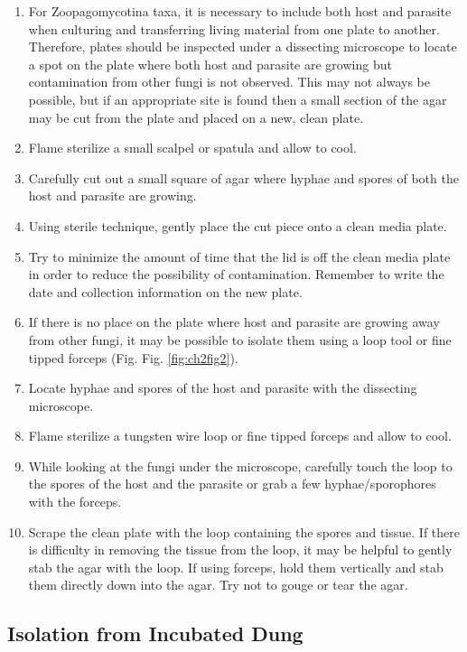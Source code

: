 \documentclass[]{book}
\providecommand{\tightlist}{%
  \setlength{\itemsep}{0pt}\setlength{\parskip}{0pt}}
\begin{document}
\begin{enumerate}
\def\labelenumi{\arabic{enumi}.}
\tightlist
\item
  For Zoopagomycotina taxa, it is necessary to include both host and parasite when culturing and transferring living material from one plate to another. Therefore, plates should be inspected under a dissecting microscope to locate a spot on the plate where both host and parasite are growing but contamination from other fungi is not observed. This may not always be possible, but if an appropriate site is found then a small section of the agar may be cut from the plate and placed on a new, clean plate.
\item
  Flame sterilize a small scalpel or spatula and allow to cool.\\
\item
  Carefully cut out a small square of agar where hyphae and spores of both the host and parasite are growing.
\item
  Using sterile technique, gently place the cut piece onto a clean media plate.
\item
  Try to minimize the amount of time that the lid is off the clean media plate in order to reduce the possibility of contamination. Remember to write the date and collection information on the new plate.
\item
  If there is no place on the plate where host and parasite are growing away from other fungi, it may be possible to isolate them using a loop tool or fine tipped forceps (Fig. Fig. \ref{fig:ch2fig2}).
\item
  Locate hyphae and spores of the host and parasite with the dissecting microscope.
\item
  Flame sterilize a tungsten wire loop or fine tipped forceps and allow to cool.
\item
  While looking at the fungi under the microscope, carefully touch the loop to the spores of the host and the parasite or grab a few hyphae/sporophores with the forceps.\\
\item
  Scrape the clean plate with the loop containing the spores and tissue. If there is difficulty in removing the tissue from the loop, it may be helpful to gently stab the agar with the loop. If using forceps, hold them vertically and stab them directly down into the agar. Try not to gouge or tear the agar.
\end{enumerate}

\hypertarget{isolation-from-incubated-dung}{%
\subsection{Isolation from Incubated Dung}\label{isolation-from-incubated-dung}}
\end{document}
